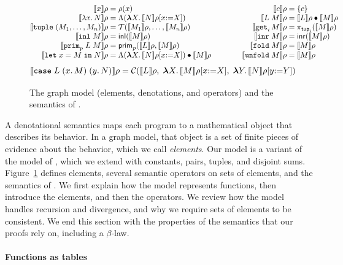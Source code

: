 \begin{figure}[t]
\[
\begin{array}{@{}r@{\;}c@{\;}l@{\qquad\qquad}r@{\;}c@{\;}l@{}}
  \den{x}\rho & = & \rho(x) &
  \den{c}\rho & = & \{c\}\\
  \den{\lambda x.\, N}\rho & = & \Lambda(\mlam{X} \den{N}\rho[x{:=}X]) &
  \den{L\;M}\rho & = & \den{L}\rho \app \den{M}\rho\\
  \den{\kw{tuple}\;(M_1, \ldots, M_n)}\rho & = & \mathcal{T}(\den{M_1}\rho, \ldots, \den{M_n}\rho) &
  \den{\kw{get}_i\,M}\rho & = & \pi_{\mathsf{tup}_i}(\den{M}\rho)\\
  \den{\kw{inl}\;M}\rho & = & \mathsf{inl}(\den{M}\rho) &
  \den{\kw{inr}\;M}\rho & = & \mathsf{inr}(\den{M}\rho)\\
  \den{\kw{prim}_p\;L\;M}\rho & = & \mathsf{prim}_p(\den{L}\rho, \den{M}\rho) &
  \den{\kw{fold}\;M}\rho & = & \den{M}\rho\\
  \den{\kw{let}\;x = M\;\kw{in}\;N}\rho & = & \Lambda(\mlam{X} \den{N}\rho[x{:=}X]) \app \den{M}\rho &
  \den{\kw{unfold}\;M}\rho & = & \den{M}\rho
\end{array}
\]
\[
  \llbracket \mathtt{case}\;L\;(x.\,M)\;(y.\,N) \rrbracket\rho =
    \mathcal{C}(\llbracket L \rrbracket\rho,\; \boldsymbol{\lambda} X.\, \llbracket M \rrbracket\rho[x{:=}X],\; \boldsymbol{\lambda} Y.\, \llbracket N \rrbracket\rho[y{:=}Y])
\]
\caption{The graph model (elements, denotations, and operators) and
  the semantics of \fpc.}
\label{fig:graph-ops}
\end{figure}

A denotational semantics maps each program to a mathematical object
that describes its behavior. In a graph model, that object is a set of
finite pieces of evidence about the behavior, which we call
\emph{elements}. Our model is a variant of the model of
\citet{Engeler:1981aa}, which we extend with constants, pairs, tuples,
and disjoint sums. Figure~\ref{fig:graph-ops} defines elements,
several semantic operators on sets of elements, and the semantics of
\fpc. We first explain how the model represents functions, then
introduce the elements, and then the operators. We review how the
model handles recursion and divergence, and why we require sets of
elements to be consistent. We end this section with the properties of
the semantics that our proofs rely on, including a $\beta$-law.

\paragraph{Functions as tables}

